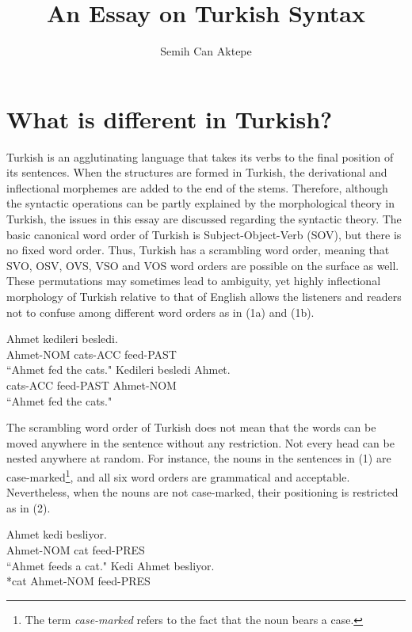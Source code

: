 \documentclass[11pt,a4paper]{article}
\author{Semih Can Aktepe}
\title{An Essay on Turkish Syntax}
\begin{document}
\thispagestyle{empty}
\maketitle
\justify
\section{What is different in Turkish?}
Turkish is an agglutinating language that takes its verbs to the final position of its sentences. When the structures are formed in Turkish, the derivational and inflectional morphemes are added to the end of the stems. Therefore, although the syntactic operations can be partly explained by the morphological theory in Turkish, the issues in this essay are discussed regarding the syntactic theory. The basic canonical word order of Turkish is Subject-Object-Verb (SOV), but there is no fixed word order. Thus, Turkish has a scrambling word order, meaning that SVO, OSV, OVS, VSO and VOS word orders are possible on the surface as well. These permutations may sometimes lead to ambiguity, yet highly inflectional morphology of Turkish relative to that of English allows the listeners and readers not to confuse among different word orders as in (1a) and (1b).
\begin{exe}
		\ex
			\begin{xlist}
				\ex Ahmet kedileri besledi.\\
				Ahmet-NOM cats-ACC feed-PAST\\
				``Ahmet fed the cats."
				\ex Kedileri besledi Ahmet.\\
				cats-ACC feed-PAST Ahmet-NOM\\
				``Ahmet fed the cats."
			\end{xlist}
	\end{exe}
The scrambling word order of Turkish does not mean that the words can be moved anywhere in the sentence without any restriction. Not every head can be nested anywhere at random. For instance, the nouns in the sentences in (1) are case-marked\footnote{The term \emph{case-marked} refers to the fact that the noun bears a case.}, and all six word orders are grammatical and acceptable. Nevertheless, when the nouns are not case-marked, their positioning is restricted as in (2).
\begin{exe}
		\ex
			\begin{xlist}
				\ex Ahmet kedi besliyor.\\
				Ahmet-NOM cat feed-PRES\\
				``Ahmet feeds a cat."
				\ex *Kedi Ahmet besliyor.\\
				*cat Ahmet-NOM feed-PRES
			\end{xlist}
	\end{exe}
\end{document}
